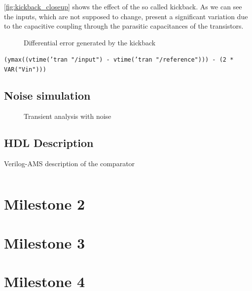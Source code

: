 \documentclass{article}
\begin{document}
 \autoref{fig:kickback_closeup} shows the effect of the so called kickback. As we can see the inputs, which are not supposed to change, present a significant variation due to the capacitive coupling through the parasitic capacitances of the transistors.

 \begin{figure}[!h]
  \centering
  \caption{Differential error generated by the kickback}
  \label{fig:kickback_diff}
  
 \end{figure}

 \texttt{(ymax((vtime('tran "/input") - vtime('tran "/reference"))) - (2 * VAR("Vin")))}
 \subsection{Noise simulation}

 \begin{figure}[!h]
  \centering
  \caption{Transient analysis with noise}
  \label{fig:noise}
  
 \end{figure}

 \subsection{HDL Description}
 \begin{listing}
  \caption{Verilog-AMS description of the comparator}
  \inputminted{verilog}{../milestone1/comparator/comp_v2/verilogams/verilog.vams}
 \end{listing}
 \section*{Milestone 2}
 \section*{Milestone 3}
 \section*{Milestone 4}
\end{document}
